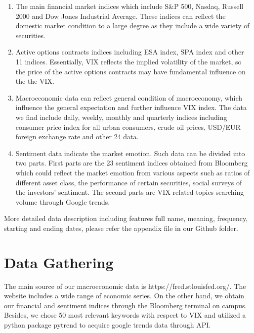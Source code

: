 \documentclass{article}
\begin{document}
\begin{enumerate}[a]
    \item The main financial market indices which include S&P 500, Nasdaq, Russell 2000 and Dow Jones Industrial Average. These indices can reflect the domestic market condition to a large degree as they include a wide variety of securities.
    
    \item Active options contracts indices including ESA index, SPA index and other 11 indices. Essentially, VIX reflects the implied volatility of the market, so the price of the active options contracts may have fundamental influence on the the VIX.
    
    \item Macroeconomic data can reflect general condition of macroeconomy, which influence the general expectation and further influence VIX index. The data we find include daily, weekly, monthly and quarterly indices including consumer price index for all urban consumers, crude oil prices, USD/EUR foreign exchange rate and other 24 data. 
    
    \item Sentiment data indicate the market emotion. Such data can be divided into two parts. First parts are the 23 sentiment indices obtained from Bloomberg which could reflect the market emotion from various aspects such as ratios of different asset class, the performance of certain securities, social surveys of the investors’ sentiment. The second parts are VIX related topics searching volume through Google trends. 
    
\end{enumerate}

More detailed data description including features full name, meaning, frequency, starting and ending dates, please refer the appendix file in our Github folder. 
 
\section*{Data Gathering}	

The main source of our macroeconomic data is  https://fred.stlouisfed.org/. The website includes a wide range of economic series. On the other hand, we obtain our financial and sentiment indices through the Bloomberg terminal on campus. Besides, we chose 50 most relevant keywords with respect to VIX and utilized a python package pytrend to acquire google trends data through API.
 
\end{document}
